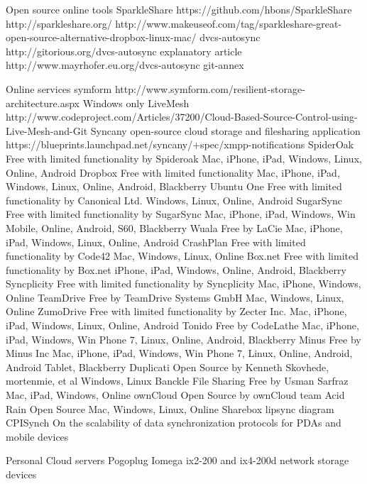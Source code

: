 		Open source online tools
			SparkleShare 
				https://github.com/hbons/SparkleShare
				http://sparkleshare.org/
				http://www.makeuseof.com/tag/sparkleshare-great-open-source-alternative-dropbox-linux-mac/
			dvcs-autosync
				http://gitorious.org/dvcs-autosync
				explanatory article
				http://www.mayrhofer.eu.org/dvcs-autosync
			git-annex
		
		
		Online services
			symform
			http://www.symform.com/resilient-storage-architecture.aspx
				Windows only
			LiveMesh 
				http://www.codeproject.com/Articles/37200/Cloud-Based-Source-Control-using-Live-Mesh-and-Git
			Syncany
				open-source cloud storage and filesharing application
				https://blueprints.launchpad.net/syncany/+spec/xmpp-notifications 
			SpiderOak
				Free with limited functionality by Spideroak
				Mac, iPhone, iPad, Windows, Linux, Online, Android
			Dropbox
				Free with limited functionality 
				Mac, iPhone, iPad, Windows, Linux, Online, Android, Blackberry
			Ubuntu One
				Free with limited functionality by Canonical Ltd. 
				Windows, Linux, Online, Android
			SugarSync
				Free with limited functionality by SugarSync 
				Mac, iPhone, iPad, Windows, Win Mobile, Online, Android, S60, Blackberry
			Wuala
				Free by LaCie 
				Mac, iPhone, iPad, Windows, Linux, Online, Android
			CrashPlan
				Free with limited functionality by Code42 
				Mac, Windows, Linux, Online
			Box.net
				Free with limited functionality by Box.net
				iPhone, iPad, Windows, Online, Android, Blackberry
			Syncplicity
				Free with limited functionality by Syncplicity
				Mac, iPhone, Windows, Online
			TeamDrive
				Free by TeamDrive Systems GmbH 
				Mac, Windows, Linux, Online
			ZumoDrive
				Free with limited functionality by Zecter Inc.
				Mac, iPhone, iPad, Windows, Linux, Online, Android
			Tonido
				Free by CodeLathe 
				Mac, iPhone, iPad, Windows, Win Phone 7, Linux, Online, Android, Blackberry
			Minus
				Free by Minus Inc 
				Mac, iPhone, iPad, Windows, Win Phone 7, Linux, Online, Android, Android Tablet, Blackberry  
			Duplicati
				Open Source by Kenneth Skovhede, mortenmie, et al 
				Windows, Linux 
			 Banckle File Sharing
				Free by Usman Sarfraz 
				Mac, iPad, Windows, Online
			ownCloud
				Open Source by ownCloud team 
			Acid Rain
				Open Source
				Mac, Windows, Linux, Online 
			Sharebox
			lipsync
				diagram
			CPISynch 
				On the scalability of data synchronization protocols for PDAs and mobile devices
				
		Personal Cloud servers		
			Pogoplug
			Iomega
				ix2-200 and ix4-200d network storage devices

